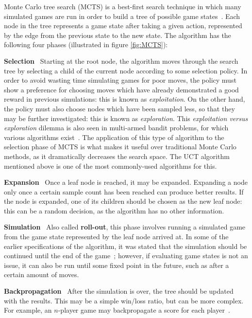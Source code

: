 Monte Carlo tree search (MCTS) is a best-first search technique in which many simulated games are run in order to build a tree of possible game states~\citep{Chaslot2008}.  Each node in the tree represents a game state after taking a given action, represented by the edge from the previous state to the new state.  The algorithm has the following four phases (illustrated in figure \ref{fig:MCTS}):

\textbf{Selection} ~Starting at the root node, the algorithm moves through the search tree by selecting a child of the current node according to some selection policy.  In order to avoid wasting time simulating games for poor moves, the policy must show a preference for choosing moves which have already demonstrated a good reward in previous simulations: this is known as \emph{exploitation}.  On the other hand, the policy must also choose nodes which have been sampled less, so that they may be further investigated: this is known as \emph{exploration}.  This \emph{exploitation versus exploration} dilemma is also seen in multi-armed bandit problems, for which various algorithms exist~\citep{Auer2002}.  The application of this type of algorithm to the selection phase of MCTS is what makes it useful over traditional Monte Carlo methods, as it dramatically decreases the search space.  The UCT algorithm~\citep{Kocsis2006} mentioned above is one of the most commonly-used algorithms for this.

\textbf{Expansion} ~Once a leaf node is reached, it may be expanded.  Expanding a node only once a certain sample count has been reached can produce better results.  If the node is expanded, one of its children should be chosen as the new leaf node: this can be a random decision, as the algorithm has no other information.

\textbf{Simulation} ~Also called \textbf{roll-out}, this phase involves running a simulated game from the game state represented by the leaf node arrived at.  In some of the earlier specifications of the algorithm, it was stated that the simulation should be continued until the end of the game~\citep{Chaslot2008}; however, if evaluating game states is not an issue, it can also be run until some fixed point in the future, such as after a certain amount of moves.

\textbf{Backpropagation} ~After the simulation is over, the tree should be updated with the results.  This may be a simple win/loss ratio, but can be more complex.  For example, an $n$-player game may backpropagate a score for each player~\citep{Samothrakis2011}.


